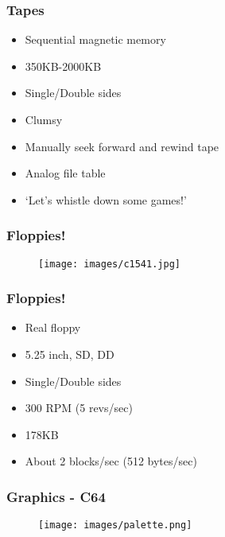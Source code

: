 \documentclass{beamer}
\begin{document}

\begin{frame}
\frametitle{Tapes}

\begin{itemize}
\item Sequential magnetic memory
\item 350KB-2000KB
\item Single/Double sides
\item Clumsy
\item Manually seek forward and rewind tape
\item Analog file table
\item `Let's whistle down some games!'
\end{itemize}

\end{frame}


\begin{frame}
\frametitle{Floppies!}

\begin{figure}
\texttt{[image: images/c1541.jpg]}
\end{figure}

\end{frame}


\begin{frame}
\frametitle{Floppies!}

\begin{itemize}
\item Real floppy
\item 5.25 inch, SD, DD
\item Single/Double sides
\item 300 RPM (5 revs/sec)
\item 178KB
\item About 2 blocks/sec (512 bytes/sec)
\end{itemize}

\end{frame}


\begin{frame}
\frametitle{Graphics - C64}

\begin{figure}
\texttt{[image: images/palette.png]}
\end{figure}

\end{frame}
\end{document}
